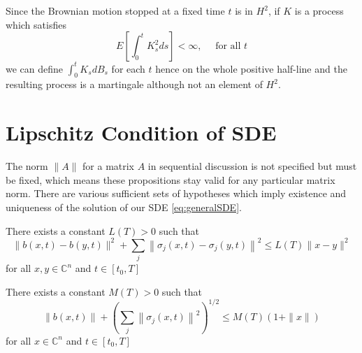 \begin{remark}\label{rmk:ito_integral_Brownian_motion}
	Since the Brownian motion stopped at a fixed time $t$ is in $H^{2}$, if $K$ is a process which satisfies
	\[ E\left[\int_{0}^{t} K_{s}^{2} d s\right]<\infty, \quad \text { for all } t \]
	we can define $\int_{0}^{t} K_{s} d B_{s}$ for each $t$ hence on the whole positive half-line and the resulting process is a martingale although not an element of $H^{2} $.
\end{remark}
\section{Lipschitz Condition of SDE}

The norm $ \|A\| $ for a matrix $ A $ in sequential discussion is not specified but must be fixed, which means these propositions stay valid for any particular matrix norm. There are various sufficient sets of hypotheses which imply existence and uniqueness of the solution of our SDE \eqref{eq:generalSDE}.
\begin{hypothesis}\label{hypo:GlobalLip} There exists a constant $L(T)>0$ such that
\[ \|b(x, t)-b(y, t)\|^{2}+\sum_{j}\left\|\sigma_{j}(x, t)-\sigma_{j}(y, t)\right\|^{2} \leq L(T)\|x-y\|^{2} \] for all $x, y \in \mathbb{C}^{n}$ and $t \in\left[t_{0}, T\right]$
\end{hypothesis}
\begin{hypothesis}\label{hypo:LinearGrowth}
There exists a constant $M(T)>0$ such that
\[ \|b(x, t)\|+\left(\sum_{j}\left\|\sigma_{j}(x, t)\right\|^{2}\right)^{1 / 2} \leq M(T)(1+\|x\|) \] for all $x \in \mathbb{C}^{n}$ and $t \in\left[t_{0}, T\right]$
\end{hypothesis}

